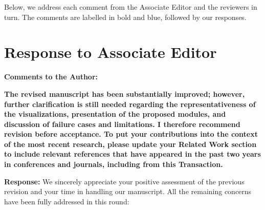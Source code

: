 \documentclass[lettersize,journal,onecolumn,12pt]{IEEEtran}
\begin{document}
Below, we address each comment from the Associate Editor and the reviewers in turn.
The comments are labelled in bold and blue, followed by our responses.

\clearpage

\tableofcontents
\newpage

\section{Response to Associate Editor}

{\color{BlueGreen} \textbf{Comments to the Author:}

\textbf{The revised manuscript has been substantially improved; however, further clarification is still needed
regarding the representativeness of the visualizations, presentation of the proposed modules, and discussion of
failure cases and limitations. I therefore recommend revision before acceptance.
To put your contributions into the context of the most recent research, please update your Related Work section
to include relevant references that have appeared in the past two years in conferences and journals, including
from this Transaction.}}

\textbf{Response:}
We sincerely appreciate your positive assessment of the previous revision and your time in handling our manuscript.
All the remaining concerns have been fully addressed in this round:
\end{document}
